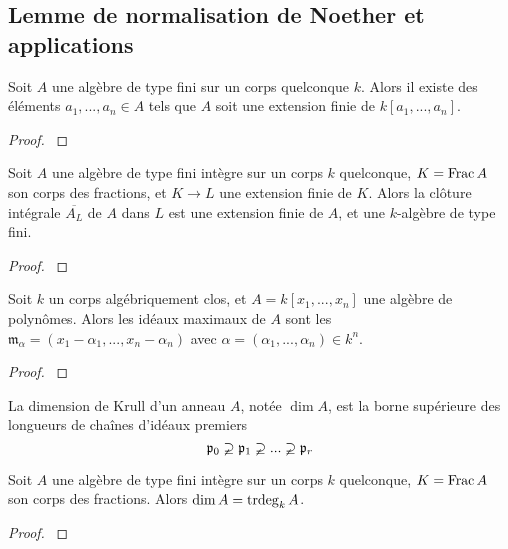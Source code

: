 \subsection{Lemme de normalisation de Noether et applications}

\begin{thm}\label{NoetherNormalisation}
Soit $A$ une algèbre de type fini sur un corps quelconque $k$. Alors il existe des éléments $a_1,...,a_n\in A$ tels que $A$ soit une extension finie de $k[a_1,...,a_n]$.
\end{thm}
\begin{proof}
\cite[I.1]{MumfordRedBook} 
\end{proof}

\begin{thm}\label{IntClosureFinite}
Soit $A$ une algèbre de type fini intègre sur un corps $k$ quelconque, $K=\operatorname{Frac} A$ son corps des fractions, et $K\rightarrow L$ une extension finie de $K$. Alors la clôture intégrale $\overline{A_L}$ de $A$ dans $L$ est une extension finie de $A$, et une $k$-algèbre de type fini.
\end{thm}
\begin{proof}
\cite[4.14]{Eisenbud} 
\end{proof}

\begin{thm}[Nullstellensatz]\label{Nullstellensatz}
Soit $k$ un corps algébriquement clos, et $A=k[x_1,...,x_n]$ une algèbre de polynômes. Alors les idéaux maximaux de $A$ sont les $\mathfrak{m}_\alpha=(x_1-\alpha_1,...,x_n-\alpha_n)$ avec $\alpha=(\alpha_1,...,\alpha_n)\in k^n$.
\end{thm}
\begin{proof}
\cite[5.3]{Matsumura}
\end{proof}

\begin{defn}
La dimension de Krull d'un anneau $A$, notée $\dim A$, est la borne supérieure des longueurs de chaînes d'idéaux premiers
$$\mathfrak{p}_0\varsupsetneq \mathfrak{p}_1 \varsupsetneq...\varsupsetneq  \mathfrak{p}_r$$
\end{defn}

\begin{thm}\label{FundamentalDimTheory}
Soit $A$ une algèbre de type fini intègre sur un corps $k$ quelconque, $K=\operatorname{Frac} A$ son corps des fractions. Alors $\dim A=\operatorname{trdeg}_k A$.
\end{thm}
\begin{proof}
\cite[5.6]{Matsumura}
\end{proof}

